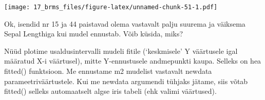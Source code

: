 \documentclass[]{book}
\newenvironment{Shaded}{\begin{snugshade}}{\end{snugshade}}
\newcommand{\CommentTok}[1]{\textcolor[rgb]{0.56,0.35,0.01}{\textit{#1}}}
\newcommand{\DataTypeTok}[1]{\textcolor[rgb]{0.13,0.29,0.53}{#1}}
\newcommand{\DecValTok}[1]{\textcolor[rgb]{0.00,0.00,0.81}{#1}}
\newcommand{\FloatTok}[1]{\textcolor[rgb]{0.00,0.00,0.81}{#1}}
\newcommand{\KeywordTok}[1]{\textcolor[rgb]{0.13,0.29,0.53}{\textbf{#1}}}
\newcommand{\NormalTok}[1]{#1}
\newcommand{\OperatorTok}[1]{\textcolor[rgb]{0.81,0.36,0.00}{\textbf{#1}}}
\newcommand{\StringTok}[1]{\textcolor[rgb]{0.31,0.60,0.02}{#1}}
\begin{document}
\begin{Shaded}
\end{Shaded}

\texttt{[image: 17\_brms\_files/figure-latex/unnamed-chunk-51-1.pdf]}

Ok, isendid nr 15 ja 44 paistavad olema vastavalt palju suurema ja väiksema Sepal Lengthiga kui mudel ennustab. Võib küsida, miks?

Nüüd plotime usaldusintervalli mudeli fitile (`keskmisele' Y väärtusele igal määratud X-i väärtusel), mitte Y-ennustusele andmepunkti kaupa. Selleks on hea fitted() funktsioon. Me ennustame m2 mudelist vastavalt newdata parameetriväärtustele. Kui me newdata argumendi tühjaks jätame, siis võtab fitted() selleks automaatselt algse iris tabeli (ehk valimi väärtused).
\end{document}
